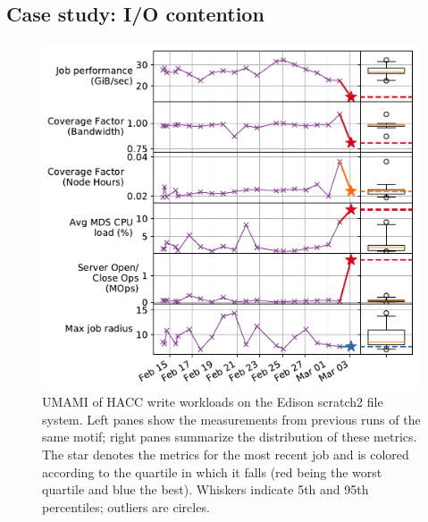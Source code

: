 \subsection{Case study: I/O contention}

\begin{figure}[t]
    \centering
    \includegraphics[width=1.0\columnwidth]{figs/umami-scratch2-hacc-write.pdf}
    \vspace{-.25in}
    \caption{UMAMI of HACC write workloads on the Edison scratch2 file system.
    Left panes show the measurements from previous runs of the same motif; right panes summarize the distribution of these metrics.
    The star denotes the metrics for the most recent job and is colored according to the quartile in which it falls (red being the worst quartile and blue the best).
    Whiskers indicate 5th and 95th percentiles; outliers are circles.}
    \label{fig:umami-scratch2-hacc-write}
    \vspace{-.2in}
\end{figure}

